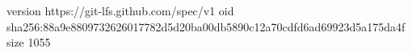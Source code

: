 version https://git-lfs.github.com/spec/v1
oid sha256:88a9e8809732626017782d5d20ba00db5890c12a70cdfd6ad69923d5a175da4f
size 1055
